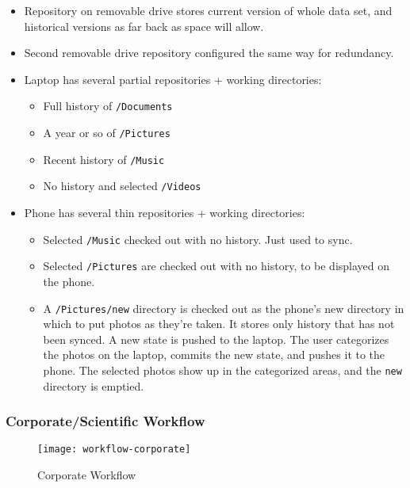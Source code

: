 \documentclass[a4paper]{article}
\begin{document}
  \begin{itemize}
  \item
    Repository on removable drive stores current version of whole data
    set, and historical versions as far back as space will allow.
  \item
    Second removable drive repository configured the same way for
    redundancy.
  \item
    Laptop has several partial repositories + working directories:

    \begin{itemize}
    \item
      Full history of \texttt{/Documents}
    \item
      A year or so of \texttt{/Pictures}
    \item
      Recent history of \texttt{/Music}
    \item
      No history and selected \texttt{/Videos}
    \end{itemize}
  \item
    Phone has several thin repositories + working directories:

    \begin{itemize}
    \item
      Selected \texttt{/Music} checked out with no history. Just used to
      sync.
    \item
      Selected \texttt{/Pictures} are checked out with no history, to be
      displayed on the phone.
    \item
      A \texttt{/Pictures/new} directory is checked out as the phone's
      new directory in which to put photos as they're taken. It stores
      only history that has not been synced. A new state is pushed to
      the laptop. The user categorizes the photos on the laptop, commits
      the new state, and pushes it to the phone. The selected photos
      show up in the categorized areas, and the \texttt{new} directory
      is emptied.
    \end{itemize}
  \end{itemize}

\subsubsection{Corporate/Scientific Workflow}

  \begin{figure}[h]
    \caption{Corporate Workflow}
    \label{fig:workflow-corporate}
    \centering
      \texttt{[image: workflow-corporate]}
  \end{figure}
\end{document}
